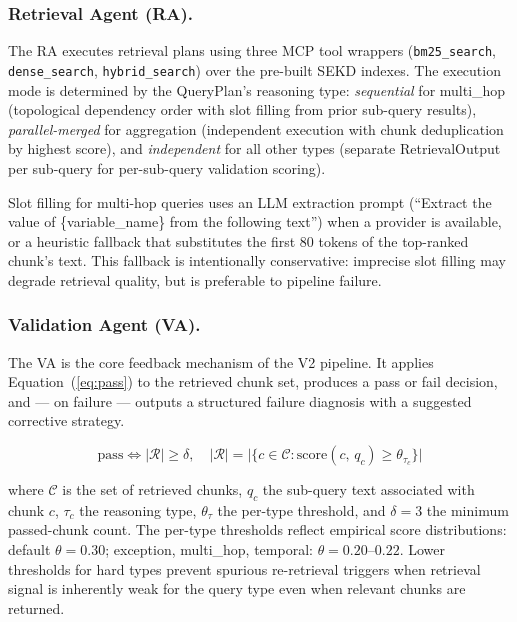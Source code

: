 \documentclass[11pt, a4paper]{article}
\begin{document}
\subsubsection*{Retrieval Agent (RA).}

The RA executes retrieval plans using three MCP tool wrappers (\texttt{bm25\_search}, \texttt{dense\_search}, \texttt{hybrid\_search}) over the pre-built SEKD indexes. The execution mode is determined by the QueryPlan's reasoning type: \textit{sequential} for multi\_hop (topological dependency order with slot filling from prior sub-query results), \textit{parallel-merged} for aggregation (independent execution with chunk deduplication by highest score), and \textit{independent} for all other types (separate RetrievalOutput per sub-query for per-sub-query validation scoring).

Slot filling for multi-hop queries uses an LLM extraction prompt (``Extract the value of \{variable\_name\} from the following text'') when a provider is available, or a heuristic fallback that substitutes the first 80 tokens of the top-ranked chunk's text. This fallback is intentionally conservative: imprecise slot filling may degrade retrieval quality, but is preferable to pipeline failure.

\subsubsection*{Validation Agent (VA).}

The VA is the core feedback mechanism of the V2 pipeline. It applies Equation~(\ref{eq:pass}) to the retrieved chunk set, produces a pass or fail decision, and --- on failure --- outputs a structured failure diagnosis with a suggested corrective strategy.

\begin{equation}
\text{pass} \iff |\mathcal{R}| \geq \delta, \quad
|\mathcal{R}| = \bigl|\{c \in \mathcal{C} : \text{score}(c,\, q_c) \geq \theta_{\tau_c}\}\bigr|
\label{eq:pass}
\end{equation}

where $\mathcal{C}$ is the set of retrieved chunks, $q_c$ the sub-query text associated with chunk $c$, $\tau_c$ the reasoning type, $\theta_{\tau}$ the per-type threshold, and $\delta=3$ the minimum passed-chunk count. The per-type thresholds reflect empirical score distributions: default $\theta=0.30$; exception, multi\_hop, temporal: $\theta=0.20$--$0.22$. Lower thresholds for hard types prevent spurious re-retrieval triggers when retrieval signal is inherently weak for the query type even when relevant chunks are returned.
\end{document}
